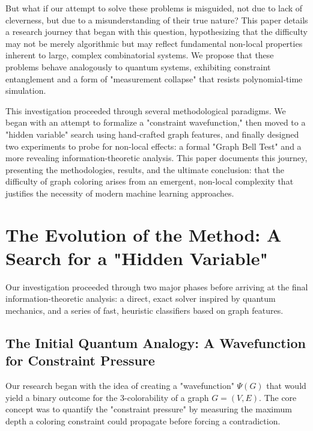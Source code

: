 \documentclass[12pt, letterpaper]{article}
\begin{document}
But what if our attempt to solve these problems is misguided, not due to lack of cleverness, but due to a misunderstanding of their true nature? This paper details a research journey that began with this question, hypothesizing that the difficulty may not be merely algorithmic but may reflect fundamental non-local properties inherent to large, complex combinatorial systems. We propose that these problems behave analogously to quantum systems, exhibiting constraint entanglement and a form of "measurement collapse" that resists polynomial-time simulation.

This investigation proceeded through several methodological paradigms. We began with an attempt to formalize a "constraint wavefunction," then moved to a "hidden variable" search using hand-crafted graph features, and finally designed two experiments to probe for non-local effects: a formal "Graph Bell Test" and a more revealing information-theoretic analysis. This paper documents this journey, presenting the methodologies, results, and the ultimate conclusion: that the difficulty of graph coloring arises from an emergent, non-local complexity that justifies the necessity of modern machine learning approaches.

\section{The Evolution of the Method: A Search for a "Hidden Variable"}

Our investigation proceeded through two major phases before arriving at the final information-theoretic analysis: a direct, exact solver inspired by quantum mechanics, and a series of fast, heuristic classifiers based on graph features.

\subsection{The Initial Quantum Analogy: A Wavefunction for Constraint Pressure}
Our research began with the idea of creating a "wavefunction" $\Psi(G)$ that would yield a binary outcome for the 3-colorability of a graph $G=(V, E)$. The core concept was to quantify the "constraint pressure" by measuring the maximum depth a coloring constraint could propagate before forcing a contradiction.
\end{document}
